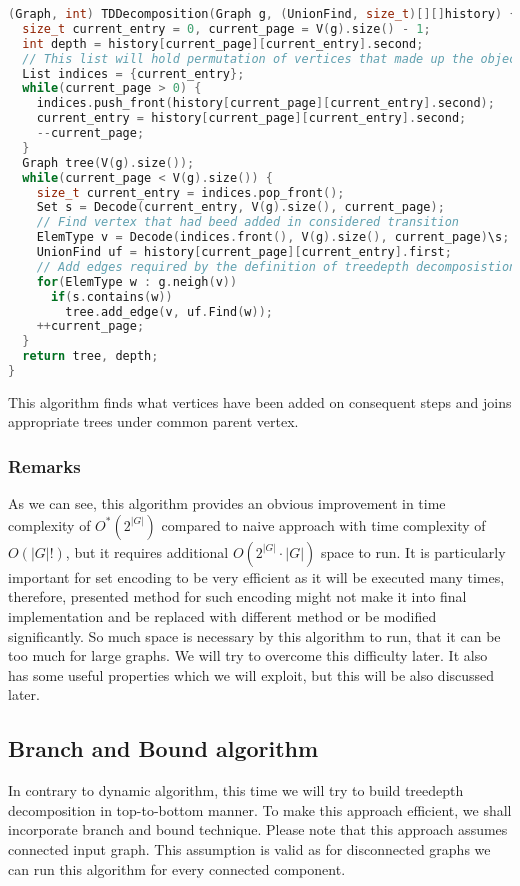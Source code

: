 \begin{lstlisting}[language=C++]
(Graph, int) TDDecomposition(Graph g, (UnionFind, size_t)[][]history) {
  size_t current_entry = 0, current_page = V(g).size() - 1;
  int depth = history[current_page][current_entry].second;
  // This list will hold permutation of vertices that made up the object in history[current_page][current_entry]
  List indices = {current_entry};
  while(current_page > 0) {
    indices.push_front(history[current_page][current_entry].second);
    current_entry = history[current_page][current_entry].second;
    --current_page;
  }
  Graph tree(V(g).size());
  while(current_page < V(g).size()) {
    size_t current_entry = indices.pop_front();
    Set s = Decode(current_entry, V(g).size(), current_page);
    // Find vertex that had beed added in considered transition
    ElemType v = Decode(indices.front(), V(g).size(), current_page)\s;
    UnionFind uf = history[current_page][current_entry].first;
    // Add edges required by the definition of treedepth decomposistion
    for(ElemType w : g.neigh(v))
      if(s.contains(w))
        tree.add_edge(v, uf.Find(w));
    ++current_page;
  }
  return tree, depth;
}
\end{lstlisting}
This algorithm finds what vertices have been added on consequent steps and joins appropriate trees under common parent vertex.
\subsubsection{Remarks}
As we can see, this algorithm provides an obvious improvement in time complexity of $O^{*}\left(2^{\left|G\right|}\right)$ compared to naive approach with time complexity of $O\left(\left|G\right|!\right)$, but it requires additional $O\left(2^{\left|G\right|}\cdot\left|G\right|\right)$ space to run. It is particularly important for set encoding to be very efficient as it will be executed many times, therefore, presented method for such encoding might not make it into final implementation and be replaced with different method or be modified significantly. So much space is necessary by this algorithm to run, that it can be too much for large graphs. We will try to overcome this difficulty later. It also has some useful properties which we will exploit, but this will be also discussed later.
\subsection{Branch and Bound algorithm}
In contrary to dynamic algorithm, this time we will try to build treedepth decomposition in top-to-bottom manner. To make this approach efficient, we shall incorporate branch and bound technique. Please note that this approach assumes connected input graph. This assumption is valid as for disconnected graphs we can run this algorithm for every connected component.
